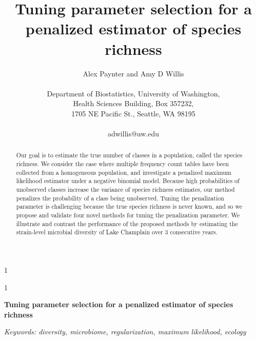 \documentclass[12pt]{article}
\theoremstyle{break}
\theoremstyle{break}
\newcommand{\blind}{1}
\begin{document}
%

\def\spacingset#1{\renewcommand{\baselinestretch}%
{#1}\small\normalsize} \spacingset{1}



\blind
{
  \title{\bf Tuning parameter selection for a penalized estimator of species richness}
  \author{Alex Paynter and Amy D Willis\\ \\
  Department of Biostatistics, University of Washington,\\
  Health Sciences Building, Box 357232,\\
  1705 NE Pacific St., Seattle, WA 98195 \\ \\
  adwillis@uw.edu}

  \maketitle
} \fi

\blind
{
  \bigskip
  \bigskip
  \bigskip
  \begin{center}
    {\LARGE\bf Tuning parameter selection for a penalized estimator of species richness}
\end{center}
  \medskip
} \fi

\bigskip
\begin{abstract}
  Our goal is to estimate the true number of classes in a population, called the species richness.  We consider the case where multiple frequency count tables have been collected from a homogeneous population, and investigate a penalized maximum likelihood estimator under a negative binomial model.
  Because high probabilities of unobserved classes increase the variance of species richness estimates,
  our method penalizes the probability of a class being unobserved. Tuning the penalization parameter is challenging because the true species richness is never known, and so we propose and validate four novel methods for tuning the penalization parameter.  We illustrate and contrast the performance of the proposed methods by estimating the strain-level microbial diversity of Lake Champlain over 3 consecutive years.
\end{abstract}

\noindent%
{\it Keywords: diversity, microbiome, regularization, maximum likelihood, ecology}
\vfill

\newpage
\spacingset{1.45} %
\end{document}

